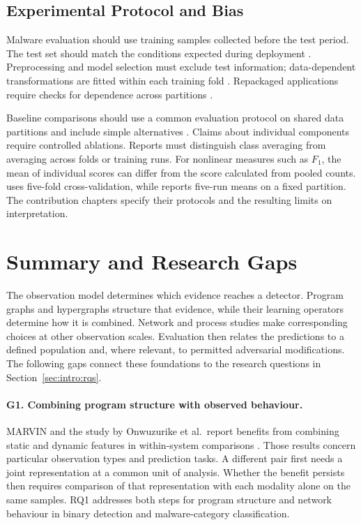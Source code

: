 \subsection{Experimental Protocol and Bias}
\label{sec:background:evaluation:bias}

Malware evaluation should use training samples collected before the test period. The test set
should match the conditions expected during deployment \cite{pendlebury2019tesseract}.
Preprocessing and model selection must exclude test information; data-dependent transformations
are fitted within each training fold \cite{arp2022dos}. Repackaged applications require
checks for dependence across partitions \cite{irolla2018duplication}.

Baseline comparisons should use a common evaluation protocol on shared data partitions and
include simple alternatives \cite{arp2022dos}. Claims about individual components require
controlled ablations. Reports
must distinguish class averaging from averaging across folds or training runs. For nonlinear
measures such as $F_1$, the mean of individual scores can differ from the score calculated from
pooled counts. \hybroid{} uses five-fold cross-validation, while \hgann{} reports five-run means
on a fixed partition. The contribution chapters specify their protocols and the resulting
limits on interpretation.

\section{Summary and Research Gaps}
\label{sec:background:summary}

The observation model determines which evidence reaches a detector. Program graphs and
hypergraphs structure that evidence, while their learning operators determine how it is
combined. Network and process studies make corresponding choices at other observation
scales. Evaluation then relates the predictions to a defined population and, where relevant,
to permitted adversarial modifications. The following gaps connect these foundations to the
research questions in Section~\ref{sec:intro:rqs}.

\paragraph{G1. Combining program structure with observed behaviour.}\label{gap:1}
MARVIN and the study by Onwuzurike et al.\ report benefits from combining static and dynamic
features in within-system comparisons \cite{lindorfer2015marvin, onwuzurike2018family}.
Those results concern particular observation types and prediction tasks. A different pair
first needs a joint representation at a common unit of analysis. Whether the benefit persists
then requires comparison of that representation with each modality alone on the same samples.
RQ1 addresses both steps for program structure and network behaviour in binary detection and
malware-category classification.

